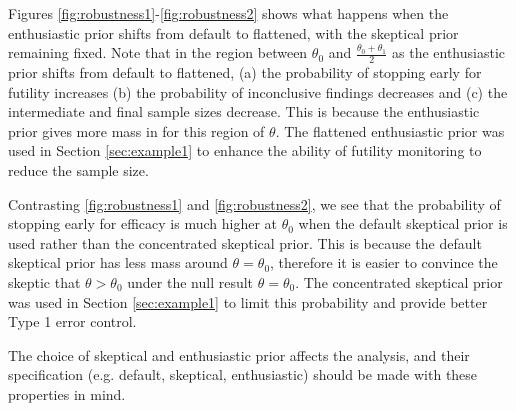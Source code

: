 \documentclass[useAMS,usenatbib,referee]{biom}
\begin{document}
Figures \ref{fig:robustness1}-\ref{fig:robustness2} shows what happens when the enthusiastic prior shifts from default to flattened, with the skeptical prior remaining fixed. Note that in the region between $\theta_0$ and $\frac{\theta_0+\theta_1}{2}$ as the enthusiastic prior shifts from default to flattened, (a) the probability of stopping early for futility increases (b) the probability of inconclusive findings decreases and (c) the intermediate and final sample sizes decrease. This is because the enthusiastic prior gives more mass in for this region of $\theta$. The flattened enthusiastic prior was used in Section \ref{sec:example1} to enhance the ability of futility monitoring to reduce the sample size.

Contrasting \ref{fig:robustness1} and \ref{fig:robustness2}, we see that the probability of stopping early for efficacy is much higher at $\theta_0$ when the default skeptical prior is used rather than the concentrated skeptical prior. This is because the default skeptical prior has less mass around $\theta=\theta_0$, therefore it is easier to convince the skeptic that $\theta>\theta_0$ under the null result $\theta=\theta_0$. The concentrated skeptical prior was used in Section \ref{sec:example1} to limit this probability and provide better Type 1 error control.

The choice of skeptical and enthusiastic prior affects the analysis, and their specification (e.g. default, skeptical, enthusiastic) should be made with these properties in mind.
\end{document}
